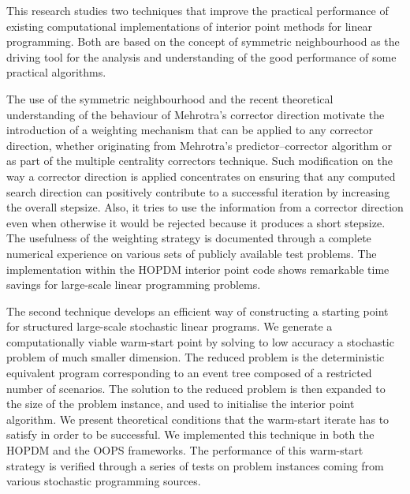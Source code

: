 
%
%

This research studies two techniques that improve
the practical performance of existing computational implementations 
of interior point methods for linear programming.
Both are based on the concept of symmetric neighbourhood 
as the driving tool for the analysis and understanding of the good 
performance of some practical algorithms. 

The use of the symmetric neighbourhood and the recent
theoretical understanding of the behaviour of Mehrotra's
corrector direction motivate the introduction of a weighting
mechanism that can be applied to any corrector direction,
whether originating from Mehrotra's predictor--corrector algorithm
or as part of the multiple centrality correctors technique.
Such modification on the way a corrector direction is applied
concentrates on ensuring that any computed search direction can positively
contribute to a successful iteration by increasing the overall
stepsize. Also, it tries to use the information from a corrector
direction even when otherwise it would be rejected because it
produces a short stepsize. 
The usefulness of the weighting strategy is documented through
a complete numerical experience on various sets of publicly
available test problems.
The implementation within the HOPDM interior point code
shows remarkable time savings for large-scale linear programming problems.

The second technique develops an efficient way of 
constructing a starting point for structured large-scale 
stochastic linear programs.
We generate a computationally viable warm-start point by solving 
to low accuracy a stochastic problem of much smaller dimension.
The reduced problem is the deterministic equivalent program
corresponding to an event tree composed of a restricted number
of scenarios.
The solution to the reduced problem is then expanded to the
size of the problem instance, and used to initialise the
interior point algorithm.
We present theoretical conditions that the warm-start iterate
has to satisfy in order to be successful.
We implemented this technique in both the HOPDM and the OOPS
frameworks.
The performance of this warm-start strategy is verified through 
a series of tests on problem instances coming from various stochastic
programming sources.
